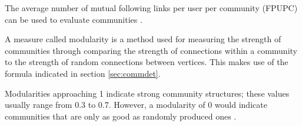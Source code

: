 The average number of mutual following links per user per community (FPUPC) can be used to evaluate communities \cite{Zhang:2012}. 


A measure called modularity is a method used for measuring the strength of communities through comparing the strength of connections within a community to the strength of random connections between vertices.\cite{Newman:2004} This makes use of the formula indicated in section \ref{sec:commdet}.


Modularities approaching 1 indicate strong community structures; these values usually range from 0.3 to 0.7. However, a modularity of 0 would indicate communities that are only as good as randomly produced ones \cite{Newman:2004}. 
